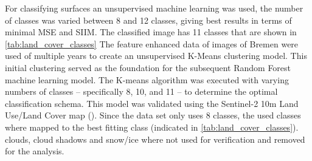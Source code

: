\documentclass[12pt,a4paper, english,twoside]{article}
\begin{document}
      For classifying surfaces an unsupervised machine learning was used, the number of classes was varied between 8 and 12 classes, giving best results in terms of minimal \gls{MSE} and \gls{SIIM}.
      The classified image has 11 classes that are shown in \cref{tab:land_cover_classes}
      The feature enhanced data of images of Bremen%
      were used of multiple years to create an unsupervised K-Means clustering model.
      This initial clustering served as the foundation for the subsequent Random Forest machine learning model.
      The K-means algorithm was executed with varying numbers of classes – specifically 8, 10, and 11 – to determine the optimal classification schema.
      This model was validated using the Sentinel-2 10m Land Use/Land Cover map (\autocite{Zhang}).
      Since the data set only uses 8 classes, the used classes where mapped to the best fitting class (indicated in \cref{tab:land_cover_classes}). 
      clouds, cloud shadows and snow/ice where not used for verification and removed for the analysis.
      
\end{document}
